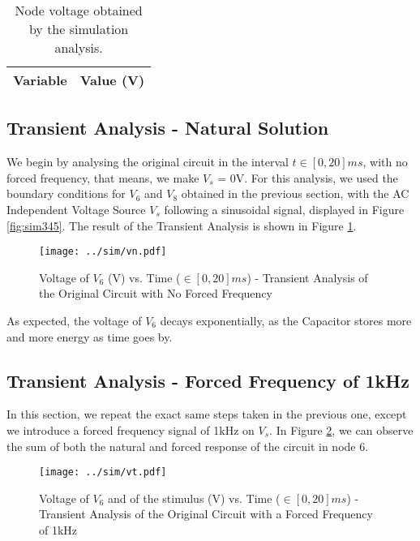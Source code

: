 \begin{table}[H]
  \centering
  \begin{tabular}{|l|r|}
    \hline
    {\bf Variable} & {\bf Value (V)} \\ \hline
    
  \end{tabular}
  \caption{Node voltage obtained by the simulation analysis.}
  \label{tab:sim_op_V}
\end{table}

\newpage

\subsection{Transient Analysis - Natural Solution}
\label{subsec:trans_NS}

We begin by  analysing the original circuit in the interval $t \in [0, 20]ms$, with no forced frequency, that means, we make $V_s$ = 0V.
For this analysis, we used the boundary conditions for $V_6$ and $V_8$ obtained in the previous section, with the AC Independent Voltage Source $V_s$ following a sinusoidal signal, displayed in Figure \ref{fig:sim345}. The result of the Transient Analysis is shown in Figure \ref{fig:sim-graph3}.

\begin{figure}[H] \centering
\texttt{[image: ../sim/vn.pdf]}
\caption{Voltage of $V_6$ (V) vs. Time ($\in [0, 20]ms$) - Transient Analysis of the Original Circuit with No Forced Frequency}
\label{fig:sim-graph3}
\end{figure}

As expected, the voltage of $V_6$ decays exponentially, as the Capacitor stores more and more energy as time goes by.

\subsection{Transient Analysis - Forced Frequency of 1kHz}
\label{subsec:trans_FS}

In this section, we repeat the exact same steps taken in the previous one, except we introduce a forced frequency signal of 1kHz on $V_s$. In Figure \ref{fig:sim-graph4}, we can observe the sum of both the natural and forced response of the circuit in node 6.


\begin{figure}[H] \centering
\texttt{[image: ../sim/vt.pdf]}
\caption{Voltage of $V_6$ and of the stimulus (V) vs. Time ($\in [0, 20]ms$) - Transient Analysis of the Original Circuit with a Forced Frequency of 1kHz}
\label{fig:sim-graph4}
\end{figure}

